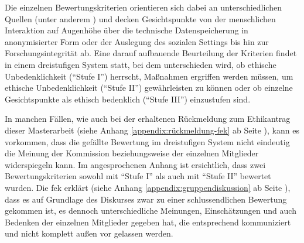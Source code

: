 \documentclass[a4paper,12pt,twoside]{scrreprt}
\begin{document}
Die einzelnen Bewertungskriterien orientieren sich dabei an unterschiedlichen Quellen (unter anderem \cite{manzeschke_meestar_2015, marckmann_was_2000, schuchter_care_2018}) und decken Gesichtspunkte von der menschlichen Interaktion auf Augenhöhe über die technische Datenspeicherung in anonymisierter Form oder der Auslegung des sozialen Settings bis hin zur Forschungsintegrität ab. Eine darauf aufbauende Beurteilung der Kriterien findet in einem dreistufigen System statt, bei dem unterschieden wird, ob ethische Unbedenklichkeit (\enquote{Stufe I}) herrscht, Maßnahmen ergriffen werden müssen, um ethische Unbedenklichkeit (\enquote{Stufe II}) gewährleisten zu können oder ob einzelne Gesichtspunkte als ethisch bedenklich (\enquote{Stufe III}) einzustufen sind. \cite[1]{forschungsethik-kommission_der_fachhochschule_vorarlberg_kriterienkatalog_2021}

\medskip

In manchen Fällen, wie auch bei der erhaltenen Rückmeldung zum Ethikantrag dieser Masterarbeit (siehe Anhang \ref{appendix:rückmeldung-fek} ab Seite \pageref{appendix:rückmeldung-fek}), kann es vorkommen, dass die gefällte Bewertung im dreistufigen System nicht eindeutig die Meinung der Kommission beziehungsweise der einzelnen Mitglieder widerspiegeln kann. Im angesprochenen Anhang ist ersichtlich, dass zwei Bewertungskriterien sowohl mit \enquote{Stufe I} als auch mit \enquote{Stufe II} bewertet wurden. Die \ac{fek} erklärt (siehe Anhang \ref{appendix:gruppendiskussion} ab Seite \pageref{appendix:gruppendiskussion}), dass es auf Grundlage des Diskurses zwar zu einer schlussendlichen Bewertung gekommen ist, es dennoch unterschiedliche Meinungen, Einschätzungen und auch Bedenken der einzelnen Mitglieder gegeben hat, die entsprechend kommuniziert und nicht komplett außen vor gelassen werden.

\medskip
\end{document}
